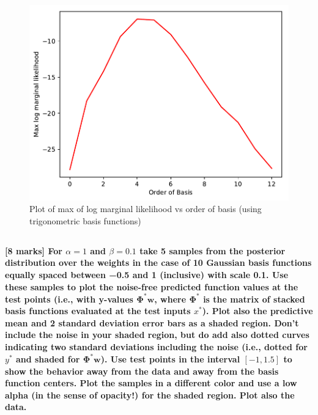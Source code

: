 \documentclass[12pt,twoside]{article}
\begin{document}
\begin{figure}[h]
\centering %
\includegraphics[width = 0.9\hsize] {./figures/basis_vs_max_mar_likeli.pdf}
\caption{Plot of max of log marginal likelihood vs order of basis (using trigonometric basis functions)}%
\label{fig:basis_vs_max_mar_likeli}
\end{figure}



\subsection{}
\textbf{[8 marks] For $\alpha = 1$ and $\beta = 0.1$ take 5 samples from the posterior distribution over the weights in the case of 10 Gaussian basis functions equally spaced between −0.5 and 1 (inclusive) with scale 0.1. Use these samples to plot the noise-free predicted function values at the test points (i.e., with y-values $\mathbf{\Phi^*w}$, where $\mathbf{\Phi^*}$ is the matrix of stacked basis functions evaluated at the test inputs $x^*$). Plot also the predictive mean and 2 standard deviation error bars as a shaded region. Don’t include the noise in your shaded region, but do add also dotted curves indicating two standard deviations including the noise (i.e., dotted for $y^*$ and shaded for $\mathbf{\Phi^*w}$). Use test points in the interval $[−1, 1.5]$ to show the behavior away from the data and away from the basis function centers. Plot the samples in a different color and use a low alpha (in the sense of opacity!) for the shaded region. Plot also the data.}
\end{document}
